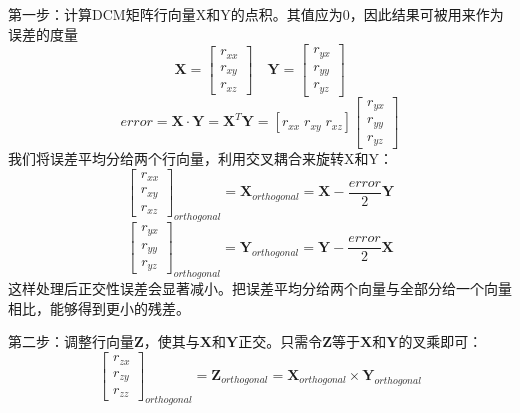 \documentclass[a4paper,10pt]{ctexart} %
\begin{document}
第一步：计算DCM矩阵行向量X和Y的点积。其值应为0，因此结果可被用来作为误差的度量
\begin{equation}
\mathbf{X}=
\left[ \begin{array}{c}
r_{xx}\\
r_{xy}\\
r_{xz}
\end{array} \right]
\quad
\mathbf{Y}=
\left[ \begin{array}{c}
r_{yx}\\
r_{yy}\\
r_{yz}
\end{array} \right]
\end{equation}
\begin{equation}
error=\mathbf{X}\cdot\mathbf{Y}=\mathbf{X}^T\mathbf{Y}
=[r_{xx}\; r_{xy}\; r_{xz}]
\left[ \begin{array}{c}
r_{yx}\\
r_{yy}\\
r_{yz}
\end{array} \right]
\end{equation}
我们将误差平均分给两个行向量，利用交叉耦合来旋转X和Y：
\begin{equation}
\left[ \begin{array}{c}
r_{xx}\\
r_{xy}\\
r_{xz}
\end{array} \right]_{orthogonal}=
\mathbf{X}_{orthogonal}=\mathbf{X}-\frac{error}{2}\mathbf{Y}
\end{equation}
\begin{equation}
\left[ \begin{array}{c}
r_{yx}\\
r_{yy}\\
r_{yz}
\end{array} \right]_{orthogonal}=
\mathbf{Y}_{orthogonal}=\mathbf{Y}-\frac{error}{2}\mathbf{X}
\end{equation}
这样处理后正交性误差会显著减小。把误差平均分给两个向量与全部分给一个向量相比，能够得到更小的残差。

第二步：调整行向量$\mathbf{Z}$，使其与$\mathbf{X}$和$\mathbf{Y}$正交。只需令$\mathbf{Z}$等于$\mathbf{X}$和$\mathbf{Y}$的叉乘即可：
\begin{equation}
\left[\begin{array}{c}
r_{zx}\\
r_{zy}\\
r_{zz}
\end{array} \right]_{orthogonal}=
\mathbf{Z}_{orthogonal}=\mathbf{X}_{orthogonal}\times\mathbf{Y}_{orthogonal}
\end{equation}
\end{document}
